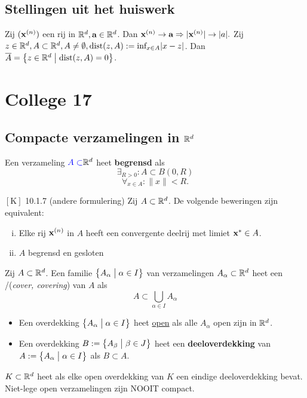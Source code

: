 \documentclass{2wa40summary}
\begin{document}
	\subsection{Stellingen uit het huiswerk}
		\theorem Zij $({\textbf{x}}^{(n)})$ een rij in $\mathbb{R}^d, {\textbf{a}} \in \mathbb{R}^d$. Dan ${\textbf{x}}^{(n)}\rightarrow {\textbf{a}} \Rightarrow |{\textbf{x}}^{(n)}|\rightarrow |a|.$
		\theorem Zij $z \in \mathbb{R}^d, A \subset \mathbb{R}^d, A \neq \emptyset, \text{dist}(z,A) := \text{inf}_{x\in A}|x-z|$.
		  Dan $\overline{A}=\big\{z\in \mathbb{R}^d \bigm| \text{dist}(z,A)=0\big\}$.
\newpage
\section{College 17}
	\subsection{Compacte verzamelingen in $\mathbb{R}^d$}
		 Een verzameling  ${\color{blue}A\subset}\mathbb{R}^d$ heet \textbf{begrensd} als \[\exists _{R>0}: A \subset B(0,R)\]
		\[\forall _{x\in A}: \|x\|<R.\]
		
		\theorem $\left[\text{K}\right]$ 10.1.7 (andere formulering)
			  Zij $A \subset \mathbb{R}^d$. De volgende beweringen zijn equivalent:
			\begin{enumerate}[(i)]
				\item Elke rij ${\textbf{x}}^{(n)}$ in $A$ heeft een convergente deelrij met limiet ${\textbf{x}}^* \in A$.
				\item $A$ begrensd en gesloten
			\end{enumerate}
		
		 Zij $A \subset \mathbb{R}^d$. Een familie $\big\{A_\alpha \bigm| \alpha \in I \big\}$ van verzamelingen $A_\alpha \subset \mathbb{R}^d$ heet een /(\textit{cover, covering}) van $A$ als \[A \subset \bigcup_{\alpha \in I}A_\alpha\]
		
		\begin{itemize}
			\item Een overdekking $\big\{ A_\alpha \bigm| \alpha \in I \big\}$ heet \underline{open} als alle $A_\alpha$ open zijn in $\mathbb{R}^d$.
			\item Een overdekking $B:=\big\{ A_\beta \bigm| \beta \in J\big\}$ heet een \textbf{deeloverdekking} van $A:=\big\{ A_\alpha \bigm| \alpha \in I \big\}$ als $B \subset A$.
		\end{itemize}
		
		 $K \subset \mathbb{R}^d$ heet  als elke open overdekking van $K$ een eindige deeloverdekking bevat.
		\note Niet-lege open verzamelingen zijn NOOIT compact.
		
\end{document}
